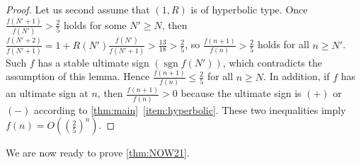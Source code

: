 \documentclass[a4paper,UKenglish,cleveref,autoref,thm-restate]{lipics-v2021}
\DeclareMathOperator{\sgn}{sgn}
\begin{document}
\begin{proof}
Let us second assume that $(1, R)$ is of hyperbolic type. Once $\frac{f(N'+1)}{f(N')} > \frac25$ holds for some $N' \geq N$, then $\frac{f(N'+2)}{f(N'+1)} = 1 + R(N')\frac{f(N')}{f(N'+1)} > \frac{13}{18} > \frac25$, so $\frac{f(n+1)}{f(n)} > \frac25$ holds for all $n \geq N'$. Such $f$ has a stable ultimate sign $(\sgn f(N'))$, which contradicts the assumption of this lemma. Hence $\frac{f(n+1)}{f(n)} \leq \frac25$ for all $n \geq N$. In addition, if $f$ has an ultimate sign at $n$, then $\frac{f(n+1)}{f(n)} > 0$ because the ultimate sign is $(+)$ or $(-)$ according to \cref{thm:main}~\eqref{item:hyperbolic}. These two inequalities imply $f(n) = O\left( \left( \frac25 \right)^n \right)$. 
\end{proof}

We are now ready to prove \cref{thm:NOW21}. 
\end{document}
